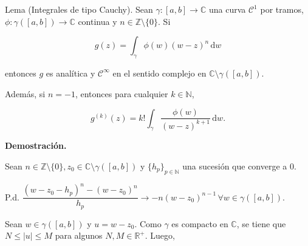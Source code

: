\documentclass[12pt, fleqn]{article}
\newcommand{\complejos}{\mathbb{C}}
\newcommand{\enteros}{\mathbb{Z}}
\newcommand{\naturales}{\mathbb{N}}
\newcommand{\reales}{\mathbb{R}}
\newcommand{\clase}[1]{$ \mathcal{C}^#1 $}
\newcommand{\integ}[3]{\int_{#1} #2 \, \mathrm{d} #3}
\begin{document}
	Lema (Integrales de tipo Cauchy). Sean $ \gamma \colon [a,b] \to \complejos $ una curva \clase{1} por tramos, $ \phi \colon \gamma([a,b]) \to \complejos $ continua y $ n \in \enteros \setminus \lbrace 0 \rbrace $. Si 

	\begin{equation*}
		g(z) = \integ{\gamma}{\phi(w)(w-z)^n}{w}
	\end{equation*}

	entonces $g$ es analítica y \clase{\infty} en el sentido complejo en $ \complejos \setminus \gamma([a,b]) $.

	Además, si $ n = -1 $, entonces para cualquier $ k \in \naturales $,

	\begin{equation*}
		g^{(k)} (z) = k! \integ{\gamma}{\dfrac{\phi(w)}{(w-z)^{k+1}}}{w}.
	\end{equation*}

	\textbf{Demostración.}

	Sean $ n \in \enteros \setminus \lbrace 0 \rbrace, z_0 \in \complejos \setminus \gamma([a,b]) $ y $ \lbrace h_p \rbrace_{p \in \naturales} $ una sucesión que converge a 0.

	P.d. $ \dfrac{(w - z_0 - h_p)^n - (w - z_0)^n}{h_p} \to -n(w - z_0)^{n-1} \, \forall w \in \gamma([a,b]) $.

	Sean $ w \in \gamma([a,b]) $ y $ u = w - z_0 $. Como $ \gamma $ es compacto en $ \complejos $, se tiene que $ N \leq \lvert u \rvert \leq M $ para algunos $ N, M \in \reales^+ $. Luego, 
\end{document}
